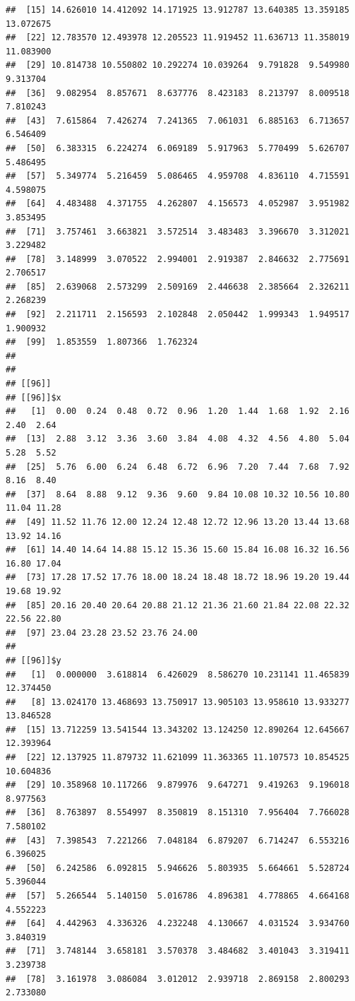 \documentclass[
  ignorenonframetext,
]{beamer}
\begin{document}
\begin{frame}[fragile]{}
\begin{verbatim}
##  [15] 14.626010 14.412092 14.171925 13.912787 13.640385 13.359185 13.072675
##  [22] 12.783570 12.493978 12.205523 11.919452 11.636713 11.358019 11.083900
##  [29] 10.814738 10.550802 10.292274 10.039264  9.791828  9.549980  9.313704
##  [36]  9.082954  8.857671  8.637776  8.423183  8.213797  8.009518  7.810243
##  [43]  7.615864  7.426274  7.241365  7.061031  6.885163  6.713657  6.546409
##  [50]  6.383315  6.224274  6.069189  5.917963  5.770499  5.626707  5.486495
##  [57]  5.349774  5.216459  5.086465  4.959708  4.836110  4.715591  4.598075
##  [64]  4.483488  4.371755  4.262807  4.156573  4.052987  3.951982  3.853495
##  [71]  3.757461  3.663821  3.572514  3.483483  3.396670  3.312021  3.229482
##  [78]  3.148999  3.070522  2.994001  2.919387  2.846632  2.775691  2.706517
##  [85]  2.639068  2.573299  2.509169  2.446638  2.385664  2.326211  2.268239
##  [92]  2.211711  2.156593  2.102848  2.050442  1.999343  1.949517  1.900932
##  [99]  1.853559  1.807366  1.762324
## 
## 
## [[96]]
## [[96]]$x
##   [1]  0.00  0.24  0.48  0.72  0.96  1.20  1.44  1.68  1.92  2.16  2.40  2.64
##  [13]  2.88  3.12  3.36  3.60  3.84  4.08  4.32  4.56  4.80  5.04  5.28  5.52
##  [25]  5.76  6.00  6.24  6.48  6.72  6.96  7.20  7.44  7.68  7.92  8.16  8.40
##  [37]  8.64  8.88  9.12  9.36  9.60  9.84 10.08 10.32 10.56 10.80 11.04 11.28
##  [49] 11.52 11.76 12.00 12.24 12.48 12.72 12.96 13.20 13.44 13.68 13.92 14.16
##  [61] 14.40 14.64 14.88 15.12 15.36 15.60 15.84 16.08 16.32 16.56 16.80 17.04
##  [73] 17.28 17.52 17.76 18.00 18.24 18.48 18.72 18.96 19.20 19.44 19.68 19.92
##  [85] 20.16 20.40 20.64 20.88 21.12 21.36 21.60 21.84 22.08 22.32 22.56 22.80
##  [97] 23.04 23.28 23.52 23.76 24.00
## 
## [[96]]$y
##   [1]  0.000000  3.618814  6.426029  8.586270 10.231141 11.465839 12.374450
##   [8] 13.024170 13.468693 13.750917 13.905103 13.958610 13.933277 13.846528
##  [15] 13.712259 13.541544 13.343202 13.124250 12.890264 12.645667 12.393964
##  [22] 12.137925 11.879732 11.621099 11.363365 11.107573 10.854525 10.604836
##  [29] 10.358968 10.117266  9.879976  9.647271  9.419263  9.196018  8.977563
##  [36]  8.763897  8.554997  8.350819  8.151310  7.956404  7.766028  7.580102
##  [43]  7.398543  7.221266  7.048184  6.879207  6.714247  6.553216  6.396025
##  [50]  6.242586  6.092815  5.946626  5.803935  5.664661  5.528724  5.396044
##  [57]  5.266544  5.140150  5.016786  4.896381  4.778865  4.664168  4.552223
##  [64]  4.442963  4.336326  4.232248  4.130667  4.031524  3.934760  3.840319
##  [71]  3.748144  3.658181  3.570378  3.484682  3.401043  3.319411  3.239738
##  [78]  3.161978  3.086084  3.012012  2.939718  2.869158  2.800293  2.733080

\end{verbatim}
\end{frame}
\end{document}
